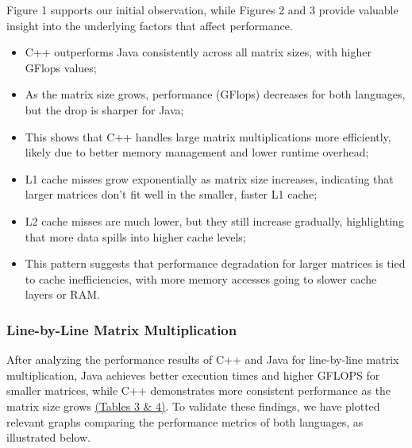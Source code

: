 \documentclass{article}
\begin{document}
Figure 1 supports our initial observation, while Figures 2 and 3 provide valuable insight into the underlying factors that affect performance.

\begin{itemize}
    \item C++ outperforms Java consistently across all matrix sizes, with higher GFlops values;
    \item As the matrix size grows, performance (GFlops) decreases for both languages, but the drop is sharper for Java;
    \item This shows that C++ handles large matrix multiplications more efficiently, likely due to better memory management and lower runtime overhead;
    \item L1 cache misses grow exponentially as matrix size increases, indicating that larger matrices don't fit well in the smaller, faster L1 cache;
    \item L2 cache misses are much lower, but they still increase gradually, highlighting that more data spills into higher cache levels;
    \item This pattern suggests that performance degradation for larger matrices is tied to cache inefficiencies, with more memory accesses going to slower cache layers or RAM.
\end{itemize}

\subsubsection{Line-by-Line Matrix Multiplication}

After analyzing the performance results of C++ and Java for line-by-line matrix multiplication, Java achieves better execution times and higher GFLOPS for smaller matrices, while C++ demonstrates more consistent performance as the matrix size grows \href{https://docs.google.com/document/d/1E8KPoQWMwUetj-bHXUUAothTzyv35YMWbAajiGcYC3A/edit?usp=sharing}{(Tables 3 \& 4)}. To validate these findings, we have plotted relevant graphs comparing the performance metrics of both languages, as illustrated below.
\end{document}

